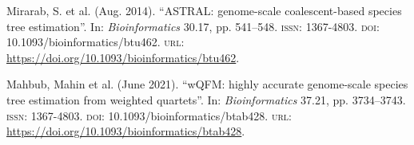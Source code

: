 \documentclass{article}
\begin{document}

% 

\begin{thebibliography}{9}

     Mirarab, S. et al. (Aug. 2014). ``ASTRAL: genome-scale coalescent-based species tree estimation''. In: \textit{Bioinformatics} 30.17, pp. 541--548. \textsc{issn}: 1367-4803. \textsc{doi}: 10.1093/bioinformatics/btu462. \textsc{url}: \url{https://doi.org/10.1093/bioinformatics/btu462}.

     Mahbub, Mahin et al. (June 2021). ``wQFM: highly accurate genome-scale species tree estimation from weighted quartets''. In: \textit{Bioinformatics} 37.21, pp. 3734--3743. \textsc{issn}: 1367-4803. \textsc{doi}: 10.1093/bioinformatics/btab428. \textsc{url}: \url{https://doi.org/10.1093/bioinformatics/btab428}.
\end{thebibliography}
\end{document}
